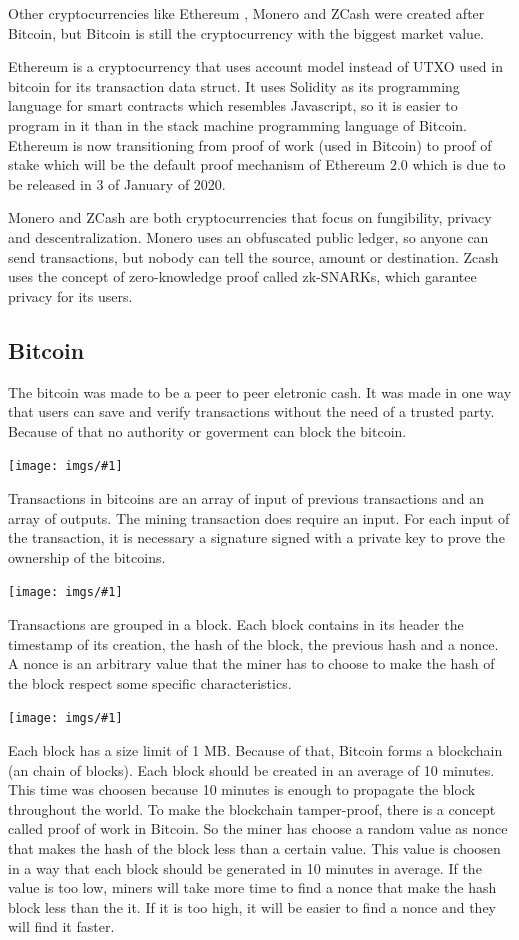 \documentclass[12pt]{article}
\newcommand{\incimg}[1]{\texttt{[image: imgs/\#1]}}
\begin{document}
Other cryptocurrencies like Ethereum \cite{wood2014ethereum}, Monero \cite{noether2015ring} and ZCash \cite{hopwood2016zcash} were created after Bitcoin,
but Bitcoin is still the cryptocurrency with the biggest market value.

Ethereum is a cryptocurrency that uses account model instead of UTXO used in bitcoin for its
transaction data struct.
It uses Solidity as its programming language for smart contracts which resembles Javascript,
so it is easier to program in it than in the stack machine programming language of Bitcoin.
Ethereum is now transitioning from proof of work (used in Bitcoin) to proof of stake
which will be the default proof mechanism of Ethereum 2.0 which is due to be released in
3 of January of 2020.

Monero and ZCash are both cryptocurrencies that focus on fungibility, privacy and descentralization.
Monero uses an obfuscated public ledger, so anyone can send transactions,
but nobody can tell the source, amount or destination.
Zcash uses the concept of zero-knowledge proof called zk-SNARKs, which garantee privacy for its users.

\subsection{Bitcoin}

The bitcoin was made to be a peer to peer eletronic cash.
It was made in one way that users can save and verify transactions without the need of a trusted party.
Because of that no authority or goverment can block the bitcoin.

\incimg{transactions1.png}

Transactions in bitcoins are an array of input of previous transactions and an array of outputs.
The mining transaction does require an input.
For each input of the transaction, it is necessary a signature signed with a private key to prove the
ownership of the bitcoins.

\incimg{transactions2.jpg}

Transactions are grouped in a block.
Each block contains in its header the timestamp of its creation, the hash of the block,
the previous hash and a nonce.
A nonce is an arbitrary value that the miner has to choose to make the hash of the block respect some
specific characteristics.

\incimg{blockchain.png}

Each block has a size limit of 1 MB.
Because of that, Bitcoin forms a blockchain (an chain of blocks).
Each block should be created in an average of 10 minutes.
This time was choosen because 10 minutes is enough to propagate the block throughout the world.
To make the blockchain tamper-proof, there is a concept called proof of work in Bitcoin.
So the miner has choose a random value as nonce that makes the hash of the block less than a certain value.
This value is choosen in a way that each block should be generated in 10 minutes in average.
If the value is too low, miners will take more time to find a nonce that make the hash block less than the it.
If it is too high, it will be easier to find a nonce and they will find it faster.
\end{document}

